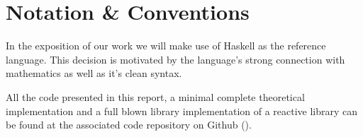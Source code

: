\section*{Notation \& Conventions}


In the exposition of our work we will make use of Haskell as the reference language. This decision is motivated by the language's strong connection with mathematics as well as it's clean syntax.

All the code presented in this report, a minimal complete theoretical implementation and a full blown library implementation of a reactive library can be found at the associated code repository on Github ().

